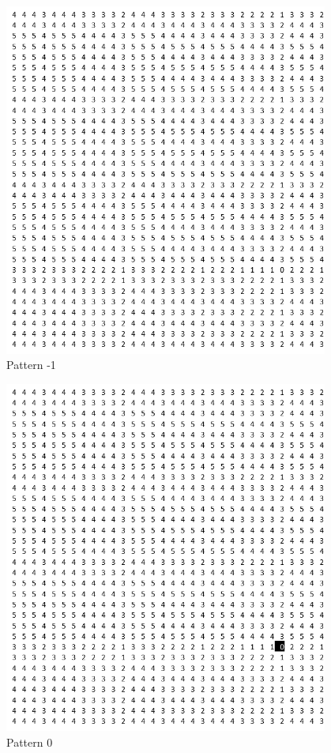 \documentclass[oneside,12pt]{DISCSthesis}
\begin{document}
{		\begin{figure}[h]\label{fig:block_patterns}
			\footnotesize\centering
			\begin{minipage}{.135\textwidth}\centering\includegraphics[width=0.95\textwidth]{img/-1}\\ Pattern -1 \end{minipage} 
			\begin{minipage}{.135\textwidth}\centering\includegraphics[width=0.95\textwidth]{img/0}\\ Pattern 0 \end{minipage} 

\end{figure}}
\end{document}
